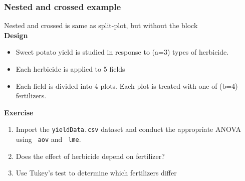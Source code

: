 \documentclass[color=usenames,dvipsnames]{beamer}\usepackage[]{graphicx}\usepackage[]{color}
\newcommand{\inr}[1]{\colorbox{inlinecolor}{\texttt{#1}}}
\begin{document}
\begin{frame}[fragile]
  \frametitle{Nested and crossed example}

{\centering \large %
  Nested and crossed is same as split-plot, but without the
  block \\}
\pause
\vfill
{\bf Design}
\begin{itemize}%
  \item Sweet potato yield is studied in response to (a=3)
    types of herbicide.
  \item Each herbicide is applied to 5 fields
  \item Each field is divided into 4 plots. Each plot is treated with
    one of (b=4) fertilizers.
\end{itemize}
\pause
\vfill
{\bf Exercise}
\begin{enumerate}[(1)]%
  \item Import the {\tt yieldData.csv} dataset and conduct
    the appropriate ANOVA using \inr{ aov} and \inr{ lme}.
  \item Does the effect of herbicide depend on fertilizer?
  \item Use Tukey's test to determine which fertilizers differ
\end{enumerate}
\end{frame}






\end{document}
